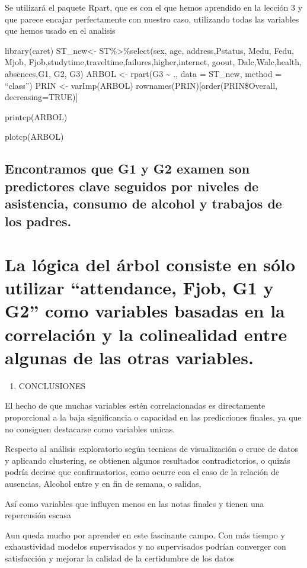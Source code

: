 \documentclass[]{article}
\providecommand{\tightlist}{%
  \setlength{\itemsep}{0pt}\setlength{\parskip}{0pt}}
\begin{document}
Se utilizará el paquete Rpart, que es con el que hemos aprendido en la
lección 3 y que parece encajar perfectamente con nuestro caso,
utilizando todas las variables que hemos usado en el analisis

library(caret) ST\_new\textless{}- ST\%\textgreater{}\%select(sex, age,
address,Pstatus, Medu, Fedu, Mjob,
Fjob,studytime,traveltime,failures,higher,internet, goout,
Dalc,Walc,health, absences,G1, G2, G3) ARBOL \textless{}- rpart(G3
\textasciitilde{} ., data = ST\_new, method = ``class'') PRIN
\textless{}- varImp(ARBOL) rownames(PRIN){[}order(PRIN\$Overall,
decreasing=TRUE){]}

printcp(ARBOL)

plotcp(ARBOL)

\subsection{Encontramos que G1 y G2 examen son predictores clave
seguidos por niveles de asistencia, consumo de alcohol y trabajos de los
padres.}\label{encontramos-que-g1-y-g2-examen-son-predictores-clave-seguidos-por-niveles-de-asistencia-consumo-de-alcohol-y-trabajos-de-los-padres.}

\section{\texorpdfstring{La lógica del árbol consiste en sólo utilizar
``attendance, Fjob, G1 y G2'' como variables basadas en la correlación y
la colinealidad entre algunas de las otras
variables.}{La lógica del árbol consiste en sólo utilizar attendance, Fjob, G1 y G2 como variables basadas en la correlación y la colinealidad entre algunas de las otras variables.}}\label{la-logica-del-arbol-consiste-en-solo-utilizar-attendance-fjob-g1-y-g2-como-variables-basadas-en-la-correlacion-y-la-colinealidad-entre-algunas-de-las-otras-variables.}

\begin{enumerate}
\def\labelenumi{\arabic{enumi}.}
\setcounter{enumi}{5}
\tightlist
\item
  CONCLUSIONES
\end{enumerate}

El hecho de que muchas variables estén correlacionadas es directamente
proporcional a la baja significancia o capacidad en las predicciones
finales, ya que no consiguen destacarse como variables unicas.

Respecto al análisis exploratorio según tecnicas de visualización o
cruce de datos y aplicando clustering, se obtienen algunos resultados
contradictorios, o quizás podría decirse que confirmatorios, como ocurre
con el caso de la relación de ausencias, Alcohol entre y en fin de
semana, o salidas,

Así como variables que influyen menos en las notas finales y tienen una
repercusión escasa

Aun queda mucho por aprender en este fascinante campo. Con más tiempo y
exhaustividad modelos supervisados y no supervisados podrían converger
con satisfacción y mejorar la calidad de la certidumbre de los datos
\end{document}

